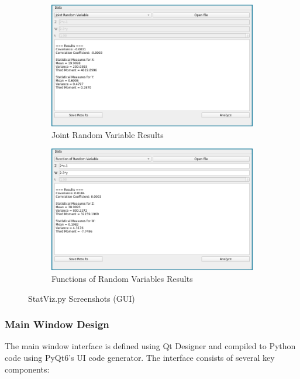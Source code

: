 \documentclass{article}
\begin{document}
\begin{figure}[H]
\begin{subfigure}{0.45\textwidth}
    \includegraphics[width=\textwidth]{figures/joint-results.png}
    \caption{Joint Random Variable Results}
  \end{subfigure}
  \hfill
  \begin{subfigure}{0.45\textwidth}
    \centering
    \includegraphics[width=\textwidth]{figures/functions-results.png}
    \caption{Functions of Random Variables Results}
  \end{subfigure}
  \caption{StatViz.py Screenshots (GUI)}
  \label{fig:gui-screenshots}
\end{figure}

\subsubsection{Main Window Design}

The main window interface is defined using Qt Designer and compiled to Python code using PyQt6's UI code generator. The interface consists of several key components:
\end{document}
